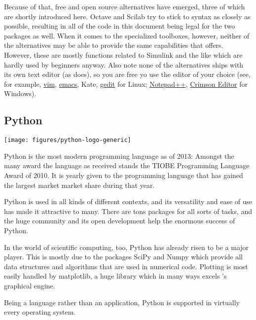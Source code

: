 Because of that, free and open source \matlab{} alternatives have emerged,
three of which are shortly introduced here. Octave and Scilab try to stick to
\matlab{} syntax as closely as possible, resulting in all of the code in this
document being legal for the two packages as well.  When it comes to the
specialized toolboxes, however, neither of the alternatives may be able to
provide the same capabilities that \matlab{} offers. However, these are mostly
functions related to Simulink and the like which are hardly used by beginners
anyway.  Also note none of the alternatives ships with its own text editor (as
\matlab{} does), so you are free yo use the editor of your choice (see, for
example, \href{http://www.vim.org/}{vim},
\href{http://www.gnu.org/software/emacs/}{emacs}, Kate,
\href{http://projects.gnome.org/gedit/}{gedit} for Linux;
\href{http://notepad-plus.sourceforge.net/uk/site.htm}{Notepad++},
\href{http://www.crimsoneditor.com/}{Crimson Editor} for Windows).

\subsection{Python}

\begin{floatingfigure}[r]{6cm}
\centering
\texttt{[image: figures/python-logo-generic]}
\end{floatingfigure}

Python is the most modern programming language as of 2013: Amongst the many
award the language as received stands the TIOBE Programming Language Award of
2010. It is yearly given to the programming language that has gained the
largest market market share during that year.

Python is used in all kinds of different contexts, and its versatility and
ease of use has made it attractive to many. There are tons packages for all
sorts of tasks, and the huge community and its open development help the
enormous success of Python.

In the world of scientific computing, too, Python has already risen to be a
major player. This is mostly due to the packages SciPy and Numpy which provide
all data structures and algorithms that are used in numerical code. Plotting
is most easily handled by matplotlib, a huge library which in many ways excels
\matlab{}'s graphical engine.

Being a language rather than an application, Python is supported in virtually
every operating system.

